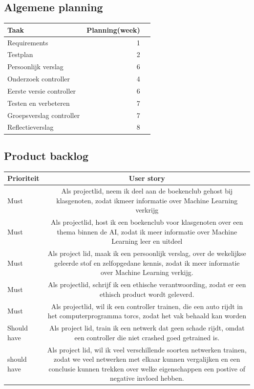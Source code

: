 \documentclass{article}
\begin{document}
\subsection{Algemene planning}
\label{eerste-draft}
\begin{table}[h!]
\begin{tabularx}{\textwidth}{l r r}
 \textbf{Taak} & \textbf{Planning(week)}  \\ \hline
 Requirements & 1 \\
 Testplan & 2  \\
 Persoonlijk verslag & 6 \\
 Onderzoek controller & 4 \\
 Eerste versie controller & 6  \\
 Testen en verbeteren & 7  \\
 Groepsverslag controller & 7  \\
 Reflectieverslag & 8  \\
\end{tabularx}
\end{table}

\newpage

\subsection*{Product backlog}

\begin{table}[h]
\begin{tabularx}{\textwidth}{l C}
 \textbf{Prioriteit} & \textbf{User story}\\ \hline
 Must & Als projectlid, neem ik deel aan de boekenclub gehost bij klasgenoten, 
zodat ikmeer informatie over Machine Learning verkrijg\\ \hline
 Must & Als projectlid, host ik een boekenclub voor klasgenoten over een thema binnen de AI, zodat ik meer informatie over Machine Learning leer en uitdeel\\\hline
Must & Als project lid, maak ik een persoonlijk verslag, over de wekelijkse geleerde stof en zelfopgedane kennis, zodat ik meer informatie over Machine Learning verkijg.   \\\hline
 Must & Als projectlid, schrijf ik een ethische verantwoording, zodat er een ethisch product wordt geleverd.   \\\hline
 Must & Als projectlid, wil ik een controller trainen, die een auto rijdt in het computerprogramma torcs, zodat het vak behaald kan worden \\\hline
Should have & Als project lid, train ik een netwerk dat geen schade rijdt, omdat een controller die niet crashed goed getrained is. \\\hline
should have & Als project lid, wil ik veel verschillende soorten netwerken trainen, zodat we veel netwerken met elkaar kunnen vergalijken en een conclusie kunnen trekken over welke eigenschappen een postive of negative invloed hebben. \\
\end{tabularx}
\end{table} 
 
\end{document}
